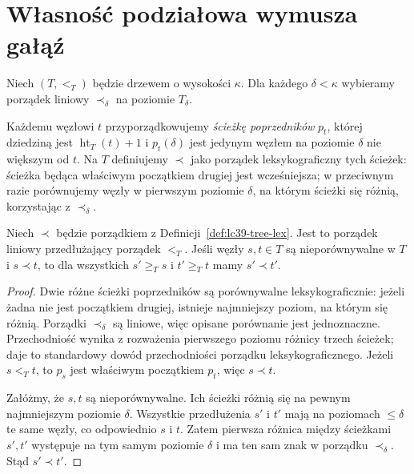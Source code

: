 \section{Własność podziałowa wymusza gałąź}

\begin{definicja}
\label{def:lc39-tree-lex}
Niech $(T,<_{T})$ będzie drzewem
o wysokości $\kappa$.
Dla każdego $\delta<\kappa$
wybieramy porządek liniowy
$\prec_\delta$ na poziomie $T_\delta$.

Każdemu węzłowi $t$ przyporządkowujemy
\emph{ścieżkę poprzedników}
$p_t$, której dziedziną jest
$\operatorname{ht}_{T}(t)+1$ i
$p_t(\delta)$ jest jedynym
węzłem na poziomie $\delta$
nie większym od $t$.
Na $T$ definiujemy $\prec$
jako porządek leksykograficzny
tych ścieżek: ścieżka będąca
właściwym początkiem drugiej
jest wcześniejsza; w przeciwnym
razie porównujemy węzły
w pierwszym poziomie $\delta$,
na którym ścieżki się różnią,
korzystając z $\prec_\delta$.
\end{definicja}

\begin{lemat}
\label{lem:lc39-lex-cones}
Niech $\prec$ będzie porządkiem
z Definicji~\ref{def:lc39-tree-lex}.
Jest to porządek liniowy
przedłużający porządek $<_{T}$.
Jeśli węzły $s,t\in T$ są
nieporównywalne w $T$ i
$s\prec t$, to dla wszystkich
$s'\ge_T s$ i $t'\ge_T t$
mamy $s'\prec t'$.
\end{lemat}
\begin{proof}
Dwie różne ścieżki poprzedników
są porównywalne leksykograficznie:
jeżeli żadna nie jest początkiem
drugiej, istnieje najmniejszy
poziom, na którym się różnią.
Porządki $\prec_\delta$ są liniowe,
więc opisane porównanie jest
jednoznaczne. Przechodniość
wynika z rozważenia pierwszego
poziomu różnicy trzech ścieżek;
daje to standardowy dowód
przechodniości porządku
leksykograficznego.
Jeżeli $s<_{T}t$, to
$p_s$ jest właściwym początkiem
$p_t$, więc $s\prec t$.

Załóżmy, że $s,t$ są
nieporównywalne.
Ich ścieżki różnią się
na pewnym najmniejszym
poziomie $\delta$.
Wszystkie przedłużenia $s'$
i $t'$ mają na poziomach
$\le\delta$ te same węzły,
co odpowiednio $s$ i $t$.
Zatem pierwsza różnica
między ścieżkami $s',t'$
występuje na tym samym
poziomie $\delta$ i ma
ten sam znak w
porządku $\prec_\delta$.
Stąd $s'\prec t'$.
\end{proof}

